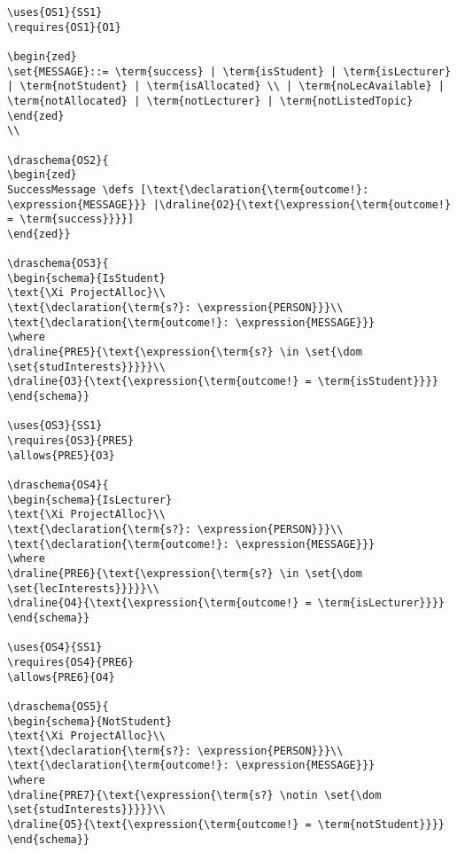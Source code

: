 \begin{verbatim}
\uses{OS1}{SS1}
\requires{OS1}{O1}

\begin{zed}
\set{MESSAGE}::= \term{success} | \term{isStudent} | \term{isLecturer} | \term{notStudent} | \term{isAllocated} \\ | \term{noLecAvailable} | \term{notAllocated} | \term{notLecturer} | \term{notListedTopic}
\end{zed}
\\

\draschema{OS2}{
\begin{zed}
SuccessMessage \defs [\text{\declaration{\term{outcome!}: \expression{MESSAGE}}} |\draline{O2}{\text{\expression{\term{outcome!} = \term{success}}}}]
\end{zed}}

\draschema{OS3}{
\begin{schema}{IsStudent}
\text{\Xi ProjectAlloc}\\
\text{\declaration{\term{s?}: \expression{PERSON}}}\\
\text{\declaration{\term{outcome!}: \expression{MESSAGE}}}
\where
\draline{PRE5}{\text{\expression{\term{s?} \in \set{\dom \set{studInterests}}}}}\\
\draline{O3}{\text{\expression{\term{outcome!} = \term{isStudent}}}}
\end{schema}}

\uses{OS3}{SS1}
\requires{OS3}{PRE5}
\allows{PRE5}{O3}

\draschema{OS4}{
\begin{schema}{IsLecturer}
\text{\Xi ProjectAlloc}\\
\text{\declaration{\term{s?}: \expression{PERSON}}}\\
\text{\declaration{\term{outcome!}: \expression{MESSAGE}}}
\where
\draline{PRE6}{\text{\expression{\term{s?} \in \set{\dom \set{lecInterests}}}}}\\
\draline{O4}{\text{\expression{\term{outcome!} = \term{isLecturer}}}}
\end{schema}}

\uses{OS4}{SS1}
\requires{OS4}{PRE6}
\allows{PRE6}{O4}

\draschema{OS5}{
\begin{schema}{NotStudent}
\text{\Xi ProjectAlloc}\\
\text{\declaration{\term{s?}: \expression{PERSON}}}\\
\text{\declaration{\term{outcome!}: \expression{MESSAGE}}}
\where
\draline{PRE7}{\text{\expression{\term{s?} \notin \set{\dom \set{studInterests}}}}}\\
\draline{O5}{\text{\expression{\term{outcome!} = \term{notStudent}}}}
\end{schema}}


\end{verbatim}

